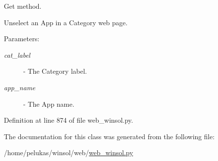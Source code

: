 Get method. 

Unselect an App in a Category web page.

\begin{Desc}
\item[Parameters:]
\begin{description}
\item[{\em cat\_\-label}]- The Category label. \item[{\em app\_\-name}]- The App name. \end{description}
\end{Desc}


Definition at line 874 of file web\_\-winsol.py.

The documentation for this class was generated from the following file:\begin{CompactItemize}
\item 
/home/pelukas/winsol/web/\hyperlink{web__winsol_8py}{web\_\-winsol.py}\end{CompactItemize}
